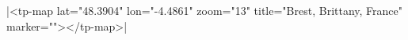 \documentclass{article}
\begin{document}
\rawhtml|<tp-map lat="48.3904" lon="-4.4861" zoom="13" title="Brest, Brittany, France" marker=""></tp-map>|
\end{document}

